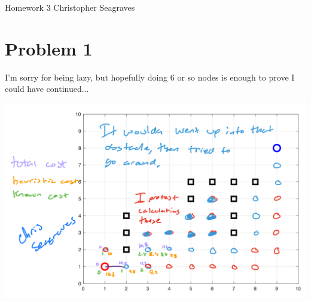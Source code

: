 \documentclass{article}
\begin{document}
    \raggedright
    Homework 3 \break
    Christopher Seagraves

    \section*{Problem 1}
        \begin{minipage}{\linewidth}
            \raggedright
            I'm sorry for being lazy, but hopefully doing 6 or so nodes is enough to prove I could have continued...
            \begin{center}
                \includegraphics[width=\linewidth]{HW3P1 AStar by hand.png}
            \end{center}
        \end{minipage}
    
\end{document}
